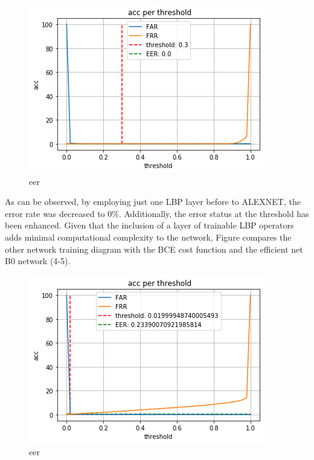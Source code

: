 \documentclass[journal]{IEEEtran}
\begin{document}
\begin{figure}[h]
	\centerline{\includegraphics[width=\linewidth]{eer-lbp}}
	\caption{eer}
	\label{fig:eer-lbp}
\end{figure}

As can be observed, by employing just one LBP layer before to ALEXNET, the error rate was decreased to 0\%. Additionally, the error status at the threshold has been enhanced.
Given that the inclusion of a layer of trainable LBP operators adds minimal computational complexity to the network, Figure compares the other network training diagram with the BCE cost function and the efficient net B0 network (4-5).

\begin{figure}[h]
	\centerline{\includegraphics[width=\linewidth]{eer-eff}}
	\caption{eer}
	\label{fig:eer-eff}
\end{figure}
\end{document}
